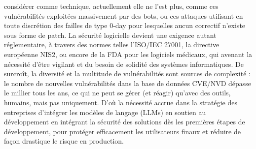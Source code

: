considérer comme technique, actuellement elle ne l’est plus, comme ces vulnérabilités
exploitées massivement par des bots, ou ces attaques utilisant en toute discrétion des failles
de type 0-day pour lesquelles aucun correctif n’existe sous forme de patch. La sécurité
logicielle devient une exigence autant réglementaire, à travers des normes telles l’ISO/IEC
27001, la directive européenne NIS2, ou encore de la FDA pour les logiciels médicaux, qui
avenant la nécessité d’être vigilant et du besoin de solidité des systèmes informatiques.
De surcroît, la diversité et la multitude de vulnérabilités sont sources de complexité : le
nombre de nouvelles vulnérabilités dans la base de données CVE/NVD dépasse le millier
tous les ans, ce qui ne peut se gérer (et réagir) qu’avec des outils, humains, mais pas
uniquement. D’où la nécessité accrue dans la stratégie des entreprises d’intégrer les
modèles de langage (LLMs) en soutien au développement en intégrant la sécurité des
solutions dès les premières étapes de développement, pour protéger efficacement les
utilisateurs finaux et réduire de façon drastique le risque en production.
